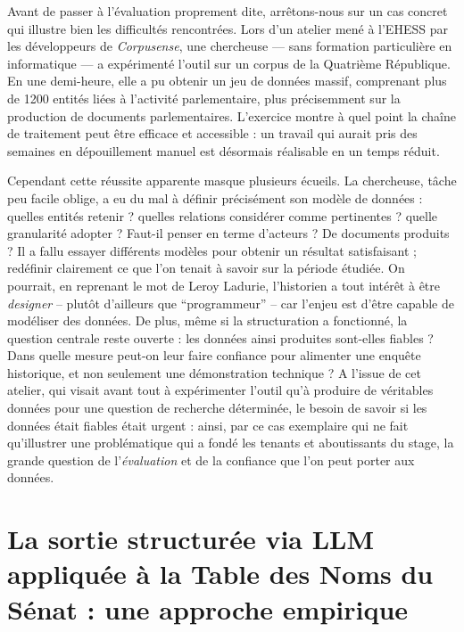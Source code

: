 Avant de passer à l’évaluation proprement dite, arrêtons-nous sur un cas concret qui illustre bien les difficultés rencontrées. Lors d’un atelier mené à l'EHESS par les développeurs de \emph{Corpusense}, une chercheuse — sans formation particulière en informatique — a expérimenté l’outil sur un corpus de la Quatrième République. En une demi-heure, elle a pu obtenir un jeu de données massif, comprenant plus de 1200 entités liées à l’activité parlementaire, plus précisemment sur la production de documents parlementaires. L’exercice montre à quel point la chaîne de traitement peut être efficace et accessible : un travail qui aurait pris des semaines en dépouillement manuel est désormais réalisable en un temps réduit. 

Cependant cette réussite apparente masque plusieurs écueils. La chercheuse, tâche peu facile oblige, a eu du mal à définir précisément son modèle de données : quelles entités retenir ? quelles relations considérer comme pertinentes ? quelle granularité adopter ? Faut-il penser en terme d'acteurs ? De documents produits ? Il a fallu essayer différents modèles pour obtenir un résultat satisfaisant ; redéfinir clairement ce que l'on tenait à savoir sur la période étudiée. On pourrait, en reprenant le mot de Leroy Ladurie, l'historien a tout intérêt à être \emph{designer} -- plutôt d'ailleurs que \enquote{programmeur} -- car l'enjeu est d'être capable de modéliser des données. De plus, même si la structuration a fonctionné, la question centrale reste ouverte : les données ainsi produites sont-elles fiables ? Dans quelle mesure peut-on leur faire confiance pour alimenter une enquête historique, et non seulement une démonstration technique ? A l'issue de cet atelier, qui visait avant tout à expérimenter l'outil qu'à produire de véritables données pour une question de recherche déterminée, le besoin de savoir si les données était fiables était urgent : ainsi, par ce cas exemplaire qui ne fait qu'illustrer une problématique qui a fondé les tenants et aboutissants du stage, la grande question de l'\emph{évaluation} et de la confiance que l'on peut porter aux données.

\chapter{La sortie structurée via LLM appliquée à la Table des Noms du Sénat : une approche empirique}

